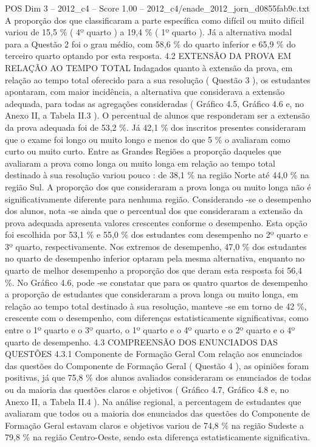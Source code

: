 \begin{textsample}{POS Dim 3 – 2012\_c4 – Score 1.00 – 2012\_c4/enade\_2012\_jorn\_d0855fab9c.txt}
A proporção dos que classificaram a parte específica como difícil ou muito difícil variou de 15,5 \% ( 4º quarto ) a 19,4 \% ( 1º quarto ).
Já a alternativa modal para a Questão 2 foi o grau médio, com 58,6 \% do quarto inferior e 65,9 \% do terceiro quarto optando por esta resposta. 4.2 EXTENSÃO DA PROVA EM RELAÇÃO AO TEMPO TOTAL Indagados quanto à extensão da prova, em relação ao tempo total oferecido para a sua resolução ( Questão 3 ), os estudantes apontaram, com maior incidência, a alternativa que considerava a extensão adequada, para todas as agregações consideradas ( Gráfico 4.5, Gráfico 4.6 e, no Anexo II, a Tabela II.3 ).
O percentual de alunos que responderam ser a extensão da prova adequada foi de 53,2 \%.
Já 42,1 \% dos inscritos presentes consideraram que o exame foi longo ou muito longo e menos do que 5 \% o avaliaram como curto ou muito curto.
Entre as Grandes Regiões a proporção daqueles que avaliaram a prova como longa ou muito longa em relação ao tempo total destinado à sua resolução variou pouco : de 38,1 \% na região Norte até 44,0 \% na região Sul.
A proporção dos que consideraram a prova longa ou muito longa não é significativamente diferente para nenhuma região.
Considerando -se o desempenho dos alunos, nota -se ainda que o percentual dos que consideraram a extensão da prova adequada apresenta valores crescentes conforme o desempenho.
Esta opção foi escolhida por 53,1 \% e 55,0 \% dos estudantes com desempenho no 2º quarto e 3º quarto, respectivamente.
Nos extremos de desempenho, 47,0 \% dos estudantes no quarto de desempenho inferior optaram pela mesma alternativa, enquanto no quarto de melhor desempenho a proporção dos que deram esta resposta foi 56,4 \%.
No Gráfico 4.6, pode -se constatar que para os quatro quartos de desempenho a proporção de estudantes que consideraram a prova longa ou muito longa, em relação ao tempo total destinado à sua resolução, manteve -se em torno de 42 \%, crescente com o desempenho, com diferenças estatisticamente significativas, como entre o 1º quarto e o 3º quarto, o 1º quarto e o 4º quarto e o 2º quarto e o 4º quarto de desempenho. 4.3 COMPREENSÃO DOS ENUNCIADOS DAS QUESTÕES 4.3.1 Componente de Formação Geral Com relação aos enunciados das questões do Componente de Formação Geral ( Questão 4 ), as opiniões foram positivas, já que 75,8 \% dos alunos avaliados consideraram os enunciados de todas ou da maioria das questões claros e objetivos ( Gráfico 4.7, Gráfico 4.8 e, no Anexo II, a Tabela II.4 ).
Na análise regional, a percentagem de estudantes que avaliaram que todos ou a maioria dos enunciados das questões do Componente de Formação Geral estavam claros e objetivos variou de 74,8 \% na região Sudeste a 79,8 \% na região Centro-Oeste, sendo esta diferença estatisticamente significativa.

\end{textsample}
